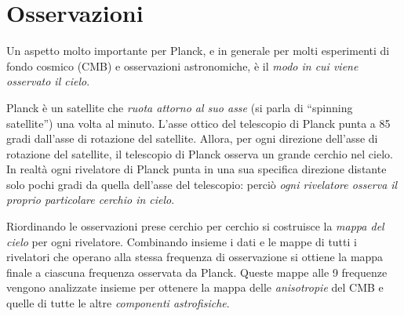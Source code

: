 \documentclass[12pt,a4paper]{article}
\begin{document}
\section*{Osservazioni}
Un aspetto molto importante per Planck, e in generale per molti esperimenti di fondo cosmico (CMB) e osservazioni astronomiche, è il \emph{modo in cui viene osservato il cielo}.

Planck è un satellite che \emph{ruota attorno al suo asse} (si parla di ``spinning satellite'') una volta al minuto. L'asse ottico del telescopio di Planck punta a 85 gradi dall'asse di rotazione del satellite. Allora, per ogni direzione dell'asse di rotazione del satellite, il telescopio di Planck osserva un grande cerchio nel cielo. In realtà ogni rivelatore di Planck punta in una sua specifica direzione distante solo pochi gradi da quella dell'asse del telescopio: perciò \emph{ogni rivelatore osserva il proprio particolare cerchio in cielo}.

Riordinando le osservazioni prese cerchio per cerchio si costruisce la \emph{mappa del cielo} per ogni rivelatore. Combinando insieme i dati e le mappe di tutti i rivelatori che operano alla stessa frequenza di osservazione si ottiene la mappa finale a ciascuna frequenza osservata da Planck. Queste mappe alle 9 frequenze vengono analizzate insieme per ottenere la mappa delle\emph{ anisotropie} del CMB e quelle di tutte le altre \emph{componenti astrofisiche}.
\end{document}
